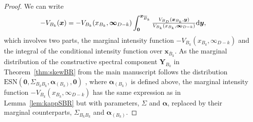 \documentclass[12pt]{article}
\begin{document}
\begin{proof}
We can write 
\begin{align*}
-V_{B_k}(\bm x) 
&=-V_{B_k}(x_{B_k},\bm\infty_{D-k})\int_{\bm 0}^{\bm x_{{\overline{B}}_k}}{\textstyle{V_{B_D}(\bm x_{B_k},\bm y)\over V_{B_k}(x_{B_k},\bm\infty_{D-k})}} \text d \bm y,
\end{align*}
which involves two parts, the marginal intensity function $-V_{B_k}(x_{B_k},\infty_{D-k})$ and the integral of the conditional intensity function over $\bm x_{\bar B_k}$. As the marginal distribution of the constructive spectral component $\bm Y_{B_k}$ in Theorem~\ref{thm:skewBR} from the main manuscript follows the distribution $\text{ESN}(\bm 0,\Sigma_{B_kB_k},\bm\alpha_{(B_k)},\bm 0)$ \citep[Chapter 5.1.4]{Azzalini:2013}, where $\bm\alpha_{(B_k)}$ is defined above, the marginal intensity function $-V_{B_k}(x_{B_k},\infty_{D-k})$ has the same expression as in Lemma~\ref{lem:kappSBR} but with parameters, $\Sigma$ and $\bm\alpha$, replaced by their marginal counterparts, $\Sigma_{B_kB_k}$ and $\bm\alpha_{(B_k)}$. 


\end{proof}
\end{document}
